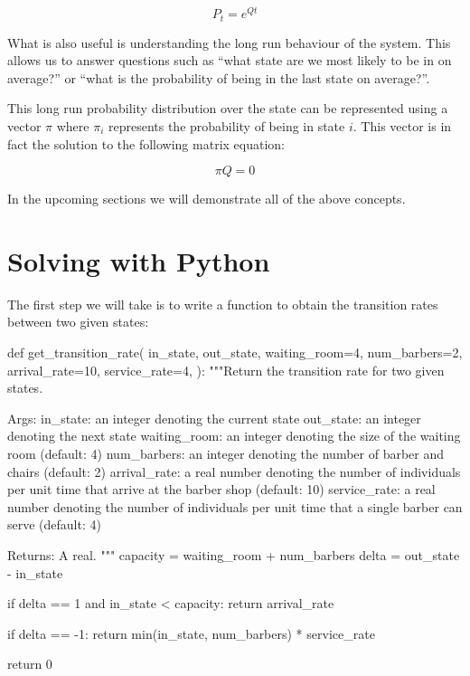 \begin{equation}
    P_t = e^{Qt}
    \label{eqn:continuous_time_markov_process_matrix_exponential}
\end{equation}

What is also useful is understanding the long run behaviour of the
system. This allows us to answer questions such as ``what state are we most
likely to be in on average?'' or ``what is the probability of being in the last
state on average?''.

This long run probability distribution over the state can be represented using a
vector \(\pi\) where \(\pi_i\) represents the probability of being in state
\(i\). This vector is in fact the solution to the following matrix equation:

\begin{equation}
    \pi Q = 0
    \label{eqn:continuous_time_markov_process_steady_state}
\end{equation}

In the upcoming sections we will demonstrate all of the above concepts.

\section{Solving with Python}\label{sec:solving-with-python}

The first step we will take is to write a function to obtain the transition
rates between two given states:


\begin{pyin}
def get_transition_rate(
    in_state,
    out_state,
    waiting_room=4,
    num_barbers=2,
    arrival_rate=10,
    service_rate=4,
):
    """Return the transition rate for two given states.

    Args:
        in_state: an integer denoting the current state
        out_state: an integer denoting the next state
        waiting_room: an integer denoting the size of the
                      waiting room (default: 4)
        num_barbers:  an integer denoting the number of
                      barber and chairs (default: 2)
        arrival_rate: a real number denoting the number of
                      individuals per unit time that arrive at
                      the barber shop (default: 10)
        service_rate: a real number denoting the number of
                      individuals per unit time that a single
                      barber can serve (default: 4)

    Returns:
        A real.
    """
    capacity = waiting_room + num_barbers
    delta = out_state - in_state

    if delta == 1 and in_state < capacity:
        return arrival_rate

    if delta == -1:
        return min(in_state, num_barbers) * service_rate

    return 0
\end{pyin}

